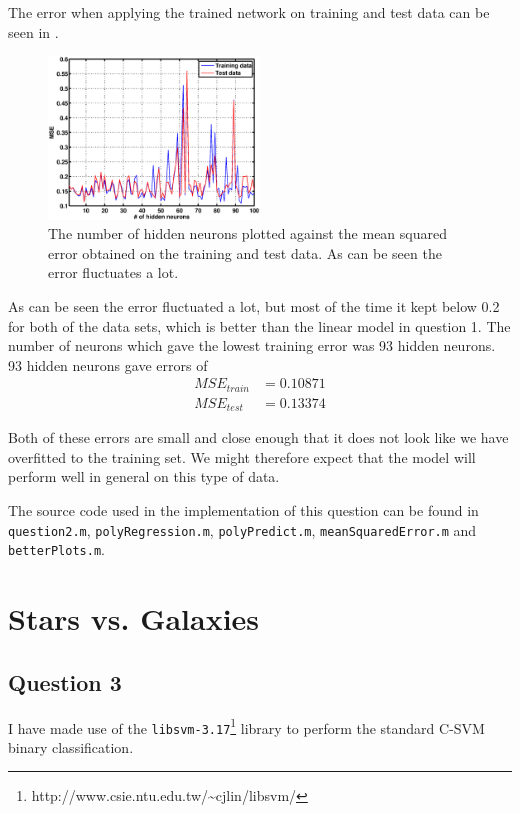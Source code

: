 \documentclass[a4paper, 11pt]{article}
\begin{document}
The error when applying the trained network on training and test data can be seen in .

\begin{figure}[H]
    \centering
    \includegraphics[width=0.5\textwidth]{figures/question2_2}
    \caption{The number of hidden neurons plotted against the mean squared error obtained on the training and test data. As can be seen the error fluctuates a lot.}\label{fig:question2_2}
\end{figure}

As can be seen the error fluctuated a lot, but most of the time it kept below 0.2 for both of the data sets, which is better than the linear model in question 1. The number of neurons which gave the lowest training error was 93 hidden neurons. 93 hidden neurons gave errors of
\begin{align*}
    MSE_{\mathit{train}} &= 0.10871 \\
    MSE_{\mathit{test}} &= 0.13374
\end{align*}

Both of these errors are small and close enough that it does not look like we have overfitted to the training set. We might therefore expect that the model will perform well in general on this type of data.

The source code used in the implementation of this question can be found in \texttt{question2.m}, \texttt{polyRegression.m}, \texttt{polyPredict.m}, \texttt{meanSquaredError.m} and \texttt{betterPlots.m}.


\section{Stars vs. Galaxies} %
\label{sec:stars_vs_galaxies}

\subsection*{Question 3}
I have made use of the \texttt{libsvm-3.17}\footnote{http://www.csie.ntu.edu.tw/\textasciitilde{}cjlin/libsvm/} library to perform the standard C-SVM binary classification.
\end{document}
